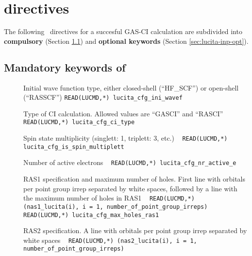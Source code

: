 \section{ directives}\label{sec:lucita-inp}

          The following \ directives for a succesful GAS-CI calculation 
are subdivided into {\bf{compulsory}} (Section \ref{sec:lucita-inp-mand}) 
and {\bf{optional keywords}} (Section \ref{sec:lucita-inp-opt}). 

\subsection{Mandatory keywords of }\label{sec:lucita-inp-mand}

\begin{description}
\item[] Initial wave function type, either closed-shell (``HF\_SCF'') or open-shell (``RASSCF'') 
\verb|READ(LUCMD,*) lucita_cfg_ini_wavef |

\item[] Type of CI calculation. Allowed values are ``GASCI'' and ``RASCI'' \verb| |\newline
\verb|READ(LUCMD,*) lucita_cfg_ci_type |

\item[] Spin state multiplicity (singlett: 1, triplett: 3, etc.) \verb| |\newline
\verb|READ(LUCMD,*) lucita_cfg_is_spin_multiplett |

\item[] Number of active electrons \verb| |\newline
\verb|READ(LUCMD,*) lucita_cfg_nr_active_e |

\vspace{0.75cm}


\item[] RAS1 specification and maximum number of holes. 
First line with orbitals per point group irrep separated by white spaces, 
followed by a line with the maximum number of holes in RAS1 \verb| |\newline
\verb|READ(LUCMD,*) (nas1_lucita(i), i = 1, number_of_point_group_irreps) |\\
\verb|READ(LUCMD,*) lucita_cfg_max_holes_ras1 |

\item[] RAS2 specification. A line with orbitals per point group irrep separated by white spaces \verb| |\newline
\verb|READ(LUCMD,*) (nas2_lucita(i), i = 1, number_of_point_group_irreps) |


\end{description}
